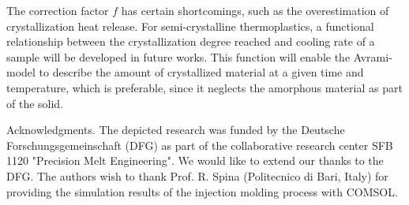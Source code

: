 \documentclass[10pt]{article}
\begin{document}
The correction factor $f$ has certain shortcomings, such as the overestimation of crystallization heat release. For semi-crystalline thermoplastics, a functional relationship between the crystallization degree reached and cooling rate of a sample will be developed in future works. This function will enable the Avrami-model to describe the amount of crystallized material at a given time and temperature, which is preferable, since it neglects the amorphous material as part of the solid.

Acknowledgments. The depicted research was funded by the Deutsche Forschungsgemeinschaft (DFG) as part of the collaborative research center SFB 1120 "Precision Melt Engineering". We would like to extend our thanks to the DFG. The authors wish to thank Prof. R. Spina (Politecnico di Bari, Italy) for providing the simulation results of the injection molding process with COMSOL.
\end{document}
